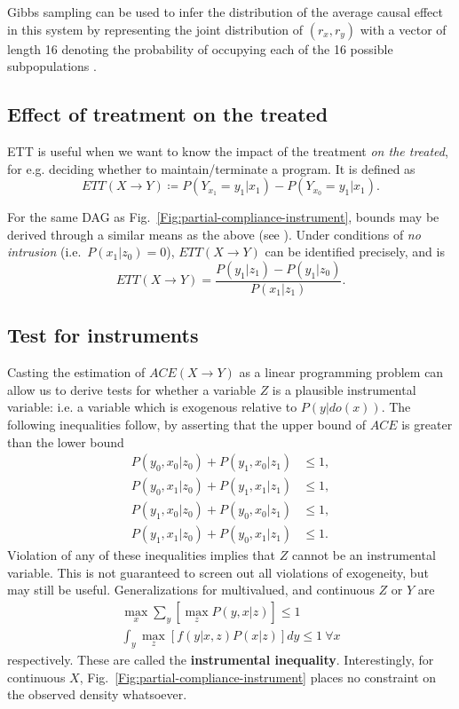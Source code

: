 \documentclass[11pt]{article}
\numberwithin{equation}{section}
\newcommand{\defeq}{\coloneqq}
\begin{document}
Gibbs sampling can be used to infer the distribution of the average causal effect in this system by representing the joint distribution of $(r_x, r_y)$ with a vector of length 16 denoting the probability of occupying each of the 16 possible subpopulations \citep{Chickering97}.

\subsection{Effect of treatment on the treated}
ETT is useful when we want to know the impact of the treatment \textit{on the treated}, for e.g. deciding whether to maintain/terminate a program. It is defined as 
\begin{equation}
ETT(X \rightarrow Y) \defeq P(Y_{x_1}=y_1|x_1) - P(Y_{x_0}=y_1|x_1).
\end{equation}

For the same DAG as Fig.~\ref{Fig:partial-compliance-instrument}, bounds may be derived through a similar means as the above (see \citep{pearl09}). Under conditions of \textit{no intrusion} (i.e.\ $P(x_1|z_0)=0$), $ETT(X \rightarrow Y)$ can be identified precisely, and is
\begin{equation}
ETT(X\rightarrow Y) = \frac{P(y_1|z_1) - P(y_1|z_0)}{P(x_1|z_1)}.
\end{equation}

\subsection{Test for instruments}
Casting the estimation of $ACE(X\rightarrow Y)$ as a linear programming problem can allow us to derive tests for whether a variable $Z$ is a plausible instrumental variable: i.e. a variable which is exogenous relative to $P(y|do(x))$. The following inequalities follow, by asserting that the upper bound of $ACE$ is greater than the lower bound
\begin{align}
P(y_0, x_0|z_0) + P(y_1, x_0| z_1) &\leq 1, \nonumber \\
P(y_0, x_1|z_0) + P(y_1, x_1| z_1) &\leq 1, \nonumber \\
P(y_1, x_0|z_0) + P(y_0, x_0| z_1) &\leq 1, \nonumber \\
P(y_1, x_1|z_0) + P(y_0, x_1| z_1) &\leq 1.
\end{align}
Violation of any of these inequalities implies that $Z$ cannot be an instrumental variable. This is not guaranteed to screen out all violations of exogeneity, but may still be useful. Generalizations for multivalued, and continuous $Z$ or $Y$ are
\begin{align}
\max_x \sum_y [\max_z P(y, x|z)] \leq 1 \\
\int_y \max_z[f(y|x,z)P(x|z)] dy \leq 1\ \forall x
\end{align}
respectively. These are called the \textbf{instrumental inequality}. Interestingly, for continuous $X$, Fig.~\ref{Fig:partial-compliance-instrument} places no constraint on the observed density whatsoever.
\end{document}
